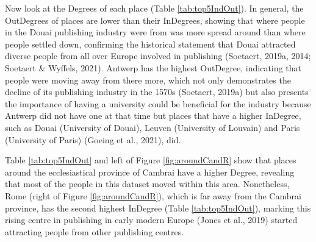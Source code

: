 \documentclass[12pt,a4paper,oneside]{book}
\begin{document}
\begin{sloppypar}
Now look at the Degrees of each place (Table \ref{tab:top5IndOut}). In general, the OutDegrees of places are lower than their InDegrees, showing that where people in the Douai publishing industry were from was more spread around than where people settled down, confirming the historical statement that Douai attracted diverse people from all over Europe involved in publishing (Soetaert, 2019a, 2014; Soetaert \& Wyffels, 2021). Antwerp has the highest OutDegree, indicating that people were moving away from there more, which not only demonstrates the decline of its publishing industry in the 1570s (Soetaert, 2019a) but also presents the importance of having a university could be beneficial for the industry because Antwerp did not have one at that time but places that have a higher InDegree, such as Douai (University of Douai), Leuven (University of Louvain) and Paris (University of Paris) (Goeing et al., 2021), did.

Table \ref{tab:top5IndOut} and left of Figure \ref{fig:aroundCandR} show that places around the ecclesiastical province of Cambrai have a higher Degree, revealing that most of the people in this dataset moved within this area. Nonetheless, Rome (right of Figure \ref{fig:aroundCandR}), which is far away from the Cambrai province, has the second highest InDegree (Table \ref{tab:top5IndOut}), marking this rising centre in publishing in early modern Europe (Jones et al., 2019) started attracting people from other publishing centres.


\end{sloppypar}
\end{document}

